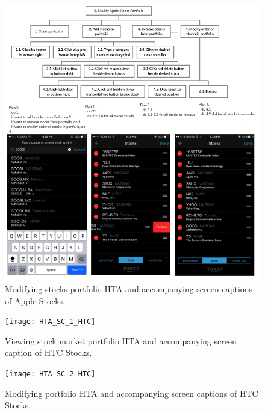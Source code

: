 \documentclass{sigchi}
\begin{document}
\begin{figure}
	\includegraphics[width=\textwidth]{HTA_SC_2_Apple}
	\caption{Modifying stocks portfolio HTA and accompanying screen captions of Apple Stocks.}
	\label{fig:figure4}
\end{figure}

\begin{figure}
	\begin{center}
		\texttt{[image: HTA\_SC\_1\_HTC]}
	\end{center}
	\caption{Viewing stock market portfolio HTA and accompanying screen caption of HTC Stocks.}
	\label{fig:figure5}
\end{figure}

\begin{figure}
	\begin{center}
		\texttt{[image: HTA\_SC\_2\_HTC]}
	\end{center}
	\caption{Modifying portfolio HTA and accompanying screen captions of HTC Stocks.}
	\label{fig:figure6}
\end{figure}
\end{document}
